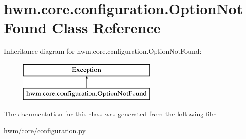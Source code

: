 \hypertarget{classhwm_1_1core_1_1configuration_1_1_option_not_found}{\section{hwm.\-core.\-configuration.\-Option\-Not\-Found Class Reference}
\label{classhwm_1_1core_1_1configuration_1_1_option_not_found}
}
Inheritance diagram for hwm.\-core.\-configuration.\-Option\-Not\-Found\-:\begin{figure}[H]
\begin{center}
\leavevmode
\includegraphics[height=2.000000cm]{classhwm_1_1core_1_1configuration_1_1_option_not_found}
\end{center}
\end{figure}


The documentation for this class was generated from the following file\-:\begin{DoxyCompactItemize}
\item 
hwm/core/configuration.\-py\end{DoxyCompactItemize}
